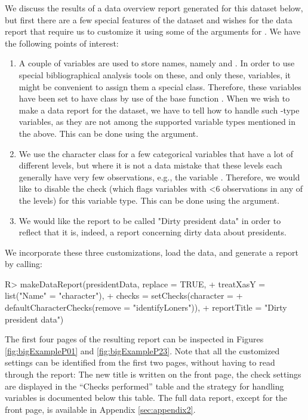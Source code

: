 \documentclass[article,shortnames]{jss}
\begin{document}
We discuss the results of a data overview report generated for this dataset below, but first there are a few special features of the dataset and wishes for the data report that require us to customize it using some of the arguments for . We have the following points of interest:
\begin{enumerate}
\item A couple of variables are used to store names, namely  and . In order to use special bibliographical analysis tools on these, and only these, variables, it might be convenient to assign them a special class. Therefore, these variables have been set to have class  by use of the base  function . When we wish to make a data report for the dataset, we have to tell  how to handle such -type variables, as they are not among the supported variable types mentioned in the above. This can be done using the  argument.
\item We use the character class for a few categorical variables that have a lot of different levels, but where it is not a data mistake that these levels each generally have very few observations, e.g., the variable . Therefore, we would like to disable the  check (which flags variables with <6 observations in any of the levels) for this variable type. This can be done using the  argument.
\item We would like the report to be called "Dirty president data" in order to reflect that it is, indeed, a report concerning dirty data about presidents.
\end{enumerate}
We incorporate these three customizations, load the data, and generate a report by calling:

\begin{Schunk}
\begin{Sinput}
R> makeDataReport(presidentData, replace = TRUE, 
+    treatXasY = list("Name" = "character"),
+    checks = setChecks(character = 
+    defaultCharacterChecks(remove = "identifyLoners")),
+    reportTitle = "Dirty president data")
\end{Sinput}
\end{Schunk}

The first four pages of the resulting report can be inspected in Figures \ref{fig:bigExampleP01} and \ref{fig:bigExampleP23}. Note that all the customized settings can be identified from the first two pages, without having to read through the report: The new title is written on the front page, the check settings are displayed in the ``Checks performed'' table and the strategy for handling  variables is documented below this table. The full data report, except for the front page, is available in Appendix \ref{sec:appendix2}. 
\end{document}
